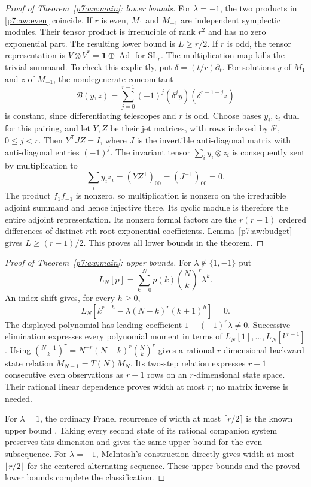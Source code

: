 \documentclass[11pt,a4paper]{article}
\theoremstyle{definition}
\theoremstyle{remark}
\numberwithin{equation}{section}
\begin{document}
\begin{proof}[Proof of Theorem~\ref{p7:aw:main}: lower bounds]
For $\lambda=-1$, the two products in \eqref{p7:aw:even} coincide.
If $r$ is even, $M_1$ and $M_{-1}$ are independent symplectic
modules. Their tensor product is irreducible of rank $r^2$ and has
no zero exponential part. The resulting lower bound is $L\ge r/2$.
If $r$ is odd, the tensor representation is
$V\otimes V^*=\mathbf1\oplus\operatorname{Ad}$ for
$\mathrm{SL}_r$. The multiplication map kills the trivial summand. To check this
explicitly, put $\delta=(t/r)\partial_t$. For solutions $y$ of
$M_1$ and $z$ of $M_{-1}$, the nondegenerate concomitant
\[
 \mathcal B(y,z)=\sum_{j=0}^{r-1}(-1)^j
                    (\delta^j y)(\delta^{r-1-j}z)
\]
is constant, since differentiating telescopes and $r$ is odd.
Choose bases $y_i,z_i$ dual for this pairing, and let $Y,Z$ be
their jet matrices, with rows indexed by $\delta^j$, $0\le j<r$.
Then $Y^{\mathsf T}JZ=I$, where $J$ is the invertible anti-diagonal
matrix with anti-diagonal entries $(-1)^j$. The invariant tensor
$\sum_i y_i\otimes z_i$ is consequently sent by multiplication to
\[
 \sum_i y_i z_i=(YZ^{\mathsf T})_{00}
                  =(J^{-\mathsf T})_{00}=0.
\]
The product $f_1f_{-1}$ is nonzero, so multiplication is nonzero on
the irreducible adjoint summand and hence injective there. Its cyclic
module is therefore the entire adjoint representation. Its nonzero formal factors are the $r(r-1)$ ordered
differences of distinct $r$th-root exponential coefficients.
Lemma~\ref{p7:aw:budget} gives $L\ge(r-1)/2$. This proves all lower
bounds in the theorem.
\end{proof}

\begin{proof}[Proof of Theorem~\ref{p7:aw:main}: upper bounds]
For $\lambda\notin\{1,-1\}$ put
\[
 L_N[p]=\sum_{k=0}^N p(k)\binom Nk^r\lambda^k.
\]
An index shift gives, for every $h\ge0$,
\[
 L_N[k^{r+h}-\lambda(N-k)^r(k+1)^h]=0.
\]
The displayed polynomial has leading coefficient
$1-(-1)^r\lambda\ne0$. Successive elimination expresses every
polynomial moment in terms of $L_N[1],\ldots,L_N[k^{r-1}]$.
Using
$\binom{N-1}{k}^r=N^{-r}(N-k)^r\binom Nk^r$
gives a rational $r$-dimensional backward state relation
$M_{N-1}=T(N)M_N$. Its two-step relation expresses $r+1$ consecutive
even observations as $r+1$ rows on an $r$-dimensional state space.
Their rational linear dependence proves width at most $r$;
no matrix inverse is needed.

For $\lambda=1$, the ordinary Franel recurrence of width at most
$\lceil r/2\rceil$ is the known upper bound
\cite{p3:Stoll1997}. Taking every second state of its rational companion
system preserves this dimension and gives the same upper bound for
the even subsequence. For $\lambda=-1$, McIntosh's construction
\cite[Theorem 1]{p3:McIntosh1993} directly gives width at most
$\lfloor r/2\rfloor$ for the centered alternating sequence.
These upper bounds and the proved lower bounds complete the
classification.
\end{proof}
\end{document}

